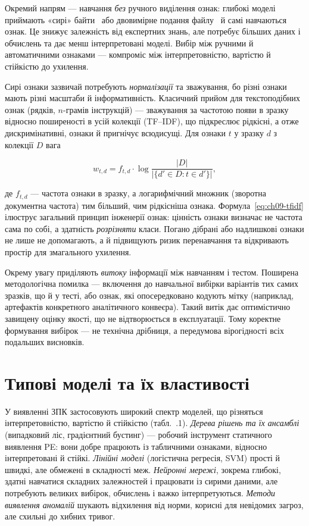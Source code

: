 Окремий напрям --- навчання \emph{без} ручного виділення ознак: глибокі моделі приймають «сирі» байти~\cite{ch09:raff} або двовимірне подання файлу~\cite{ch09:saxe} й самі навчаються ознак. Це знижує залежність від експертних знань, але потребує більших даних і обчислень та дає менш інтерпретовані моделі. Вибір між ручними й автоматичними ознаками --- компроміс між інтерпретовністю, вартістю й стійкістю до ухилення.

Сирі ознаки зазвичай потребують \emph{нормалізації} та зважування, бо різні ознаки мають різні масштаби й інформативність. Класичний прийом для текстоподібних ознак (рядків, $n$-грамів інструкцій) --- зважування за частотою появи в зразку відносно поширеності в усій колекції (TF--IDF), що підкреслює рідкісні, а отже дискримінативні, ознаки й пригнічує всюдисущі. Для ознаки $t$ у зразку $d$ з колекції $D$ вага

\begin{equation}
w_{t,d} = f_{t,d}\cdot\log\frac{|D|}{|\{d'\in D: t\in d'\}|},
\label{eq:ch09-tfidf}
\end{equation}

де $f_{t,d}$ --- частота ознаки в зразку, а логарифмічний множник (зворотна документна частота) тим більший, чим рідкісніша ознака. Формула~\eqref{eq:ch09-tfidf} ілюструє загальний принцип інженерії ознак: цінність ознаки визначає не частота сама по собі, а здатність \emph{розрізняти} класи. Погано дібрані або надлишкові ознаки не лише не допомагають, а й підвищують ризик перенавчання та відкривають простір для змагального ухилення.

Окрему увагу приділяють \emph{витоку} інформації між навчанням і тестом. Поширена методологічна помилка --- включення до навчальної вибірки варіантів тих самих зразків, що й у тесті, або ознак, які опосередковано кодують мітку (наприклад, артефактів конкретного аналітичного конвеєра). Такий витік дає оптимістично завищену оцінку якості, що не відтворюється в експлуатації. Тому коректне формування вибірок --- не технічна дрібниця, а передумова вірогідності всіх подальших висновків.

\section{Типові моделі та їх властивості}\label{sec:ch09-models}

У виявленні ЗПК застосовують широкий спектр моделей, що різняться інтерпретовністю, вартістю й стійкістю (табл.~\thechapter.1). \emph{Дерева рішень та їх ансамблі} (випадковий ліс, градієнтний бустинг) --- робочий інструмент статичного виявлення PE: вони добре працюють із табличними ознаками, відносно інтерпретовані й стійкі. \emph{Лінійні моделі} (логістична регресія, SVM) прості й швидкі, але обмежені в складності меж. \emph{Нейронні мережі}, зокрема глибокі, здатні навчатися складних залежностей і працювати із сирими даними, але потребують великих вибірок, обчислень і важко інтерпретуються. \emph{Методи виявлення аномалій} шукають відхилення від норми, корисні для невідомих загроз, але схильні до хибних тривог.

